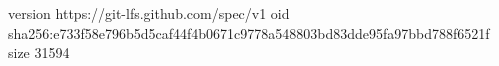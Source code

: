 version https://git-lfs.github.com/spec/v1
oid sha256:e733f58e796b5d5caf44f4b0671c9778a548803bd83dde95fa97bbd788f6521f
size 31594
